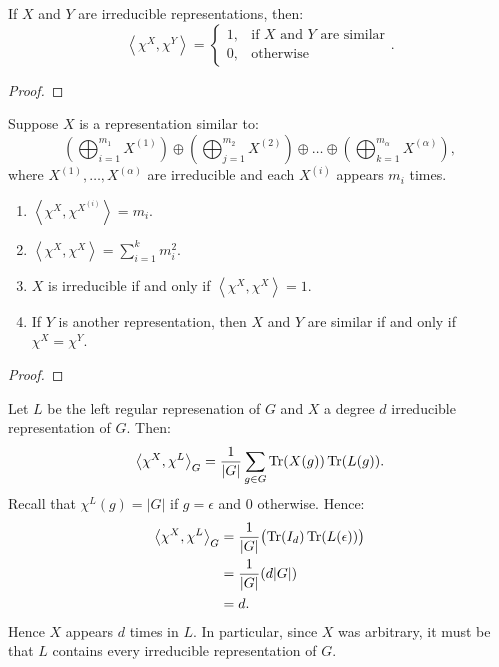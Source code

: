 \begin{theorem}
	If $X$ and $Y$ are irreducible representations, then:
	\[
			\left<\chi^X, \chi^Y \right> = \begin{cases}1, & \text{if $X$ and $Y$ are similar} \\ 0, & \text{otherwise}\end{cases}.
	\] 
\end{theorem}
	{\color{red}
	\begin{proof}
			
	\end{proof}}

\begin{theorem}
	Suppose $X$ is a representation similar to:
	\[
		\left(\bigoplus_{i = 1}^{m_1}X^{(1)}\right) \oplus \left( \bigoplus_{j = 1}^{m_2}X^{(2)}\right) \oplus \ldots  \oplus \left(\bigoplus_{k = 1}^{m_\alpha}X^{(\alpha)}\right),
	\] 
	where $X^{(1)},\ldots ,X^{(\alpha)}$ are irreducible and each $X^{(i)}$ appears $m_i$ times.
	\mbox{}
	\begin{enumerate}[label = (\arabic*),itemsep=1pt,topsep=3pt]
		\item $\left<\chi^X, \chi^{X^{(i)}} \right> = m_i$.
		\item $\left<\chi^X,\chi^X \right> = \sum_{i=1}^{k}m_i^2 $.
		\item $X$ is irreducible if and only if $\left<\chi^X,\chi^X \right> = 1$.
		\item If $Y$ is another representation, then $X$ and $Y$ are similar if and only if $\chi^X = \chi^Y$.
	\end{enumerate}
\end{theorem}
	{\color{red}
	\begin{proof}
			
	\end{proof}}

\begin{example}
	Let $L$ be the left regular represenation of $G$ and $X$ a degree $d$ irreducible representation of $G$. Then:
	\[
		\left<\chi^X,\chi^L \right>_G = \frac{1}{|G|}\sum_{g \in G}^{} \operatorname{Tr}(X(g))\operatorname{Tr}(L(g)).
	\] 
	Recall that $\chi^L(g) = |G|$ if $g = \epsilon$ and $0$ otherwise. Hence:
	\begin{align*}
		\left<\chi^X,\chi^L \right>_G
		&= \frac{1}{|G|}\bigl( \operatorname{Tr}(I_d)\operatorname{Tr}(L(\epsilon)) \bigr) \\
		&= \frac{1}{|G|}(d|G|) \\
		&= d.
	\end{align*}
	Hence $X$ appears $d$ times in $L$. In particular, since $X$ was arbitrary, it must be that $L$ contains every irreducible representation of $G$.
\end{example}

